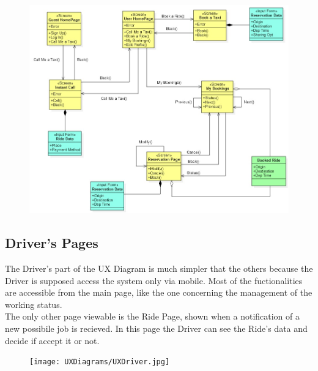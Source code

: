 \begin{figure}[h!]
\centering
		\includegraphics[width=1\textwidth]{UXDiagrams/UXBooking.jpg}
	\end{figure}

\newpage
\subsection{Driver's Pages}
The Driver's part of the UX Diagram is much simpler that the others because the Driver is supposed access the system only via mobile. Most of the fuctionalities are accessible from the main page, like the one concerning the management of the working status. \\
The only other page viewable is the Ride Page, shown when a notification of a new possibile job is recieved. In this page the Driver can see the Ride's data and decide if accept it or not.
\\
\begin{figure}[h!]
		\centering
		\texttt{[image: UXDiagrams/UXDriver.jpg]}
	\end{figure}